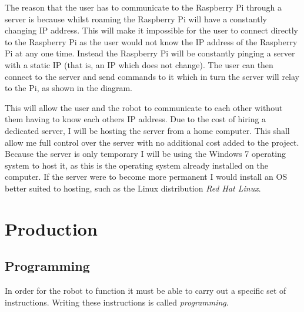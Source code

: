 \documentclass[]{report}   %
\begin{document}
				The reason that the user has to communicate to the Raspberry Pi through a server is because whilst roaming the Raspberry Pi will have a constantly
				changing IP address. This will make it impossible for the user to connect directly to the Raspberry Pi as the user would not know the IP address of
				the Raspberry Pi at any one time. Instead the Raspberry Pi will be constantly pinging a server with a static IP (that is, an IP which does not change).
				The user can then connect to the server and send commands to it which in turn the server will relay to the Pi, as shown in the diagram.
				
				This will allow the user and the robot to communicate to each other without them having to know each others IP address. Due to the cost of hiring a
				dedicated server, I will be hosting the server from a home computer. This shall allow me full control over the server with no additional cost added
				to the project. Because the server is only temporary I will be using the Windows 7 operating system to host it, as this is the operating system
				already installed on the computer. If the server were to become more permanent I would install an OS better suited to hosting, such as the Linux
				distribution \emph{Red Hat Linux}.
		
		\chapter{Production}
			\section{Programming}
				In order for the robot to function it must be able to carry out a specific set of instructions. Writing these instructions is called \emph{programming}.
				
\end{document}
